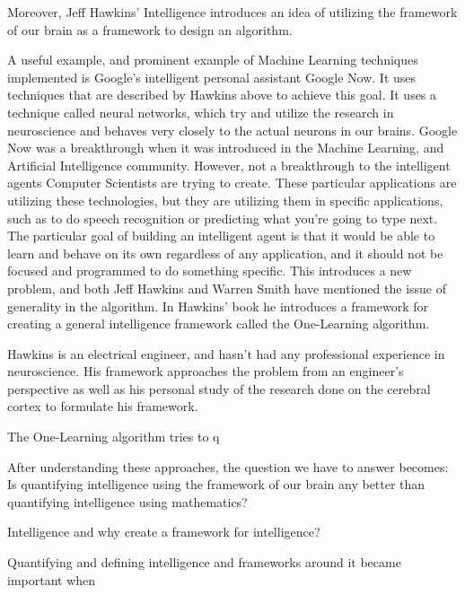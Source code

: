 \documentclass[11pt, oneside]{article}
\begin{document}
\par Moreover, Jeff Hawkins' Intelligence introduces an idea of utilizing the framework of our brain as a framework to design an algorithm. 

\par A useful example, and prominent example of Machine Learning techniques implemented is Google's intelligent personal assistant Google Now. It uses techniques that are described by Hawkins above to achieve this goal. It uses a technique called neural networks, which try and utilize the research in neuroscience and behaves very closely to the actual neurons in our brains. Google Now was a breakthrough when it was introduced in the Machine Learning, and Artificial Intelligence community. However, not a breakthrough to the intelligent agents Computer Scientists are trying to create. These particular applications are utilizing these technologies, but they are utilizing them in specific applications, such as to do speech recognition or predicting what you're going to type next. The particular goal of building an intelligent agent is that it would be able to learn and behave on its own regardless of any application, and it should not be focused and programmed to do something specific. This introduces a new problem, and both Jeff Hawkins and Warren Smith have mentioned the issue of generality in the algorithm. In Hawkins' book he introduces a framework for creating a general intelligence framework called the One-Learning algorithm.

\par Hawkins is an electrical engineer, and hasn't had any professional experience in neuroscience. His framework approaches the problem from an engineer's perspective as well as his personal study of the research done on the cerebral cortex to formulate his framework.

\par The One-Learning algorithm tries to q

\par After understanding these approaches, the question we have to answer becomes: Is quantifying intelligence using the framework of our brain any better than quantifying intelligence using mathematics? 

\par Intelligence and why create a framework for intelligence?

\par Quantifying and defining intelligence and frameworks around it became important when
\end{document}
